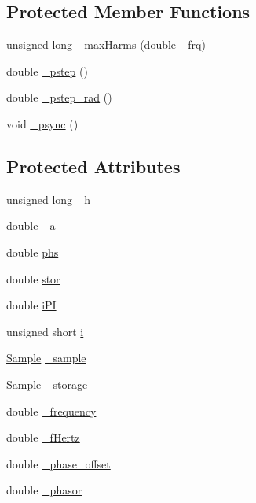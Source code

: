 \subsection*{Protected Member Functions}
\begin{DoxyCompactItemize}
\item 
unsigned long \hyperlink{classSignal_1_1Fourier_1_1FourierGenerator_a99720416bd9ff96636f4acf956a785d5}{\+\_\+max\+Harms} (double \+\_\+frq)
\item 
double \hyperlink{classSignal_1_1SignalGenerator_a43b0eec84ee7df04c947533c0511c2c0}{\+\_\+pstep} ()
\item 
double \hyperlink{classSignal_1_1SignalGenerator_abf2f4ab977c6e84bf85022eab8135304}{\+\_\+pstep\+\_\+rad} ()
\item 
void \hyperlink{classSignal_1_1SignalGenerator_a563f57d4dfd8728a6a572f15c1e2532b}{\+\_\+psync} ()
\end{DoxyCompactItemize}
\subsection*{Protected Attributes}
\begin{DoxyCompactItemize}
\item 
unsigned long \hyperlink{classSignal_1_1Fourier_1_1Saw_a7e796347f04f0f4370a472587701b82b}{\+\_\+h}
\item 
double \hyperlink{classSignal_1_1Fourier_1_1Saw_af31172dae9d5fcd2fcdb0adb7c41bacf}{\+\_\+a}
\item 
double \hyperlink{classSignal_1_1Fourier_1_1Saw_a3c26ea58f2340c1d9a296937cec78a86}{phs}
\item 
double \hyperlink{classSignal_1_1Fourier_1_1Saw_a31859d02406add22e072936c33f386af}{stor}
\item 
double \hyperlink{classSignal_1_1Fourier_1_1Saw_a70dccb676ad58a1b6ef4b053081bec3f}{i\+P\+I}
\item 
unsigned short \hyperlink{classSignal_1_1Fourier_1_1Saw_a1e575a999b316e51cb3a4f8af962749c}{i}
\item 
\hyperlink{classSignal_1_1Sample}{Sample} \hyperlink{classSignal_1_1Fourier_1_1FourierGenerator_ad720bf2b268dc621ace64c54c0816597}{\+\_\+sample}
\item 
\hyperlink{classSignal_1_1Sample}{Sample} \hyperlink{classSignal_1_1Fourier_1_1FourierGenerator_ab6e6b79cf56e31c9a1b5766f357f8cfb}{\+\_\+storage}
\item 
double \hyperlink{classSignal_1_1SignalGenerator_a7f107461333bce68c5dad412db96a8c2}{\+\_\+frequency}
\item 
double \hyperlink{classSignal_1_1SignalGenerator_a85a4702347352bab1c71e0a8df8437d6}{\+\_\+f\+Hertz}
\item 
double \hyperlink{classSignal_1_1SignalGenerator_a6b4444d46747c8517171edbbf4b5588f}{\+\_\+phase\+\_\+offset}
\item 
double \hyperlink{classSignal_1_1SignalGenerator_af4aa0728ded00777be26a06d883eaeb3}{\+\_\+phasor}
\end{DoxyCompactItemize}


